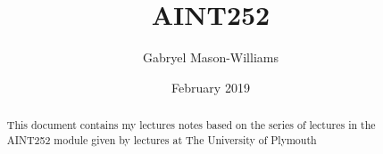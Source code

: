\documentclass{article}
\title{AINT252}
\author{Gabryel Mason-Williams }
\date{February 2019}
\begin{document}
\def\layersep{2.5cm}
\maketitle
\begin{abstract}
    This document contains my lectures notes based on the series of lectures in the AINT252 module given by lectures at The University of Plymouth 
\end{abstract}
\newpage
\tableofcontents
\newpage
%
\newpage
%
\newpage
%
\newpage
%
\newpage
%
\newpage
%
\newpage
%
\newpage
%
\newpage

\end{document}
